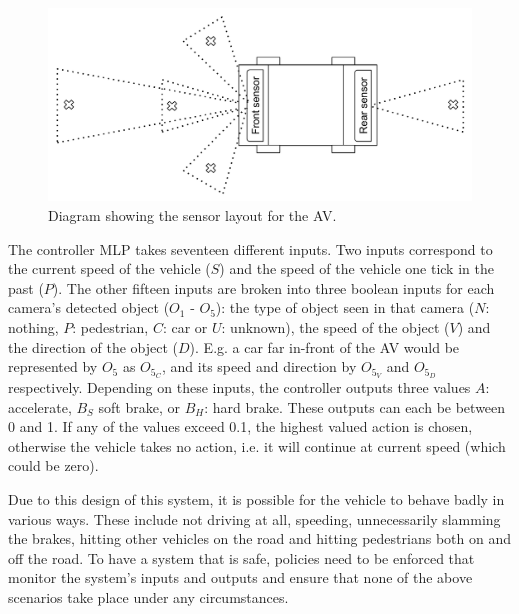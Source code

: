 \begin{figure}[t]
	\centering
	\includegraphics[width=\linewidth]{Content/fig/AV.pdf}
	\caption{Diagram showing the sensor layout for the \ac{AV}. \label{fig:av}}
\end{figure}

The controller \ac{MLP} takes seventeen different inputs. 
Two inputs correspond to the current speed of the vehicle ($S$) and the speed of the vehicle one tick in the past ($P$). 
The other fifteen inputs are broken into three boolean inputs for each camera's detected object ($O_1$ - $O_5$): the type of object seen in that camera ($N$: nothing, $P$: pedestrian, $C$: car or $U$: unknown), the speed of the object ($V$) and the direction of the object ($D$).
E.g. a car far in-front of the \ac{AV} would be represented by $O_5$ as $O_{5_C}$, and its speed and direction by $O_{5_V}$ and $O_{5_D}$ respectively.
Depending on these inputs, the controller outputs three values  $A$: accelerate, $B_S$ soft brake, or $B_H$: hard brake.
These outputs can each be between 0 and 1.
If any of the values exceed 0.1, the highest valued action is chosen, otherwise the vehicle takes no action, i.e. it will continue at current speed (which could be zero).

Due to this design of this system, it is possible for the vehicle to behave badly in various ways. 
These include not driving at all, speeding, unnecessarily slamming the brakes, hitting other vehicles on the road and hitting pedestrians both on and off the road.
To have a system that is safe, policies need to be enforced that monitor the system's inputs and outputs and ensure that none of the above scenarios take place under any circumstances.

